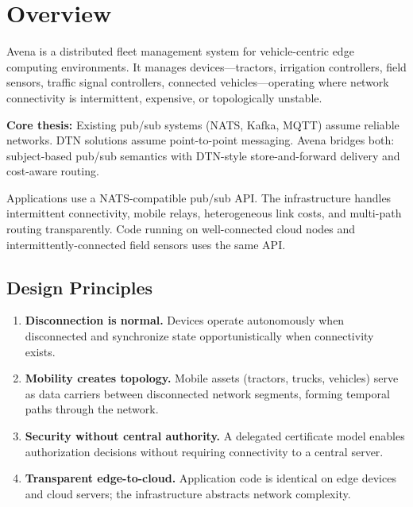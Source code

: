 
\section{Overview}

Avena is a distributed fleet management system for vehicle-centric edge computing environments. It manages devices---tractors, irrigation controllers, field sensors, traffic signal controllers, connected vehicles---operating where network connectivity is intermittent, expensive, or topologically unstable.

\textbf{Core thesis:} Existing pub/sub systems (NATS, Kafka, MQTT) assume reliable networks. DTN solutions assume point-to-point messaging. Avena bridges both: subject-based pub/sub semantics with DTN-style store-and-forward delivery and cost-aware routing.

Applications use a NATS-compatible pub/sub API. The infrastructure handles intermittent connectivity, mobile relays, heterogeneous link costs, and multi-path routing transparently. Code running on well-connected cloud nodes and intermittently-connected field sensors uses the same API.

\subsection{Design Principles}

\begin{enumerate}[label=\textbf{\arabic*.}]
    \item \textbf{Disconnection is normal.} Devices operate autonomously when disconnected and synchronize state opportunistically when connectivity exists.
    \item \textbf{Mobility creates topology.} Mobile assets (tractors, trucks, vehicles) serve as data carriers between disconnected network segments, forming temporal paths through the network.
    \item \textbf{Security without central authority.} A delegated certificate model enables authorization decisions without requiring connectivity to a central server.
    \item \textbf{Transparent edge-to-cloud.} Application code is identical on edge devices and cloud servers; the infrastructure abstracts network complexity.
\end{enumerate}

